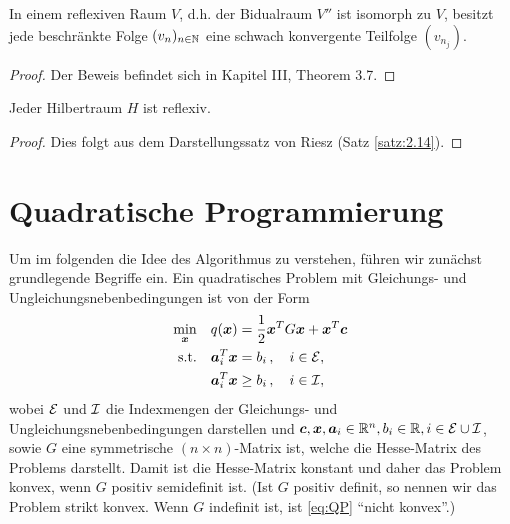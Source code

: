 \begin{theorem}\label{theorem:A.14}
In einem reflexiven Raum $V$, d.h. der Bidualraum $V''$ ist isomorph zu $V$, besitzt jede beschränkte Folge $(v_n)_{n\in \mathbb{N}}$ eine schwach konvergente Teilfolge $(v_{n_j})$.
\end{theorem}

\begin{proof}
Der Beweis befindet sich in \cite{Werner} Kapitel III, Theorem 3.7.
\end{proof}

\begin{bem}\label{bem:A.15}
Jeder Hilbertraum $H$ ist reflexiv.
\end{bem}

\begin{proof}
Dies folgt aus dem Darstellungssatz von Riesz (Satz \ref{satz:2.14}).
\end{proof}










\label{anhang:B}

\section{Quadratische Programmierung}
\label{anhang:B.1}

Um im folgenden die Idee des Algorithmus zu verstehen, führen wir zunächst grundlegende Begriffe ein. Ein quadratisches Problem mit Gleichungs- und Ungleichungsnebenbedingungen ist von der Form
\begin{align}\label{eq:QP}
\begin{aligned}
	\min_{\boldsymbol x} & \quad q(\boldsymbol x) = \frac 1 2 \boldsymbol x^T G\boldsymbol x + \boldsymbol x^T \boldsymbol c \\
	\text{s.t.} & \quad \boldsymbol a_i^T \boldsymbol x = b_i \, , \quad i \in \mathcal E, \\
	& \quad \boldsymbol a_i^T \boldsymbol x\ge b_i \, , \quad i \in \mathcal I,
\end{aligned}
\end{align}
wobei $\mathcal E$ und $ \mathcal I$ die Indexmengen der Gleichungs- und Ungleichungsnebenbedingungen darstellen und $\boldsymbol c,\boldsymbol x,\boldsymbol a_i \in \mathbb{R}^n, b_i \in \mathbb{R}, i \in \mathcal E \cup \mathcal I$, sowie $G$ eine symmetrische $(n\times n)$-Matrix ist, welche die Hesse-Matrix des Problems darstellt. Damit ist die Hesse-Matrix konstant und daher das Problem konvex, wenn $G$ positiv semidefinit ist. (Ist $G$ positiv definit, so nennen wir das Problem strikt konvex. Wenn $G$ indefinit ist, ist \eqref{eq:QP} "`nicht konvex"'.)

